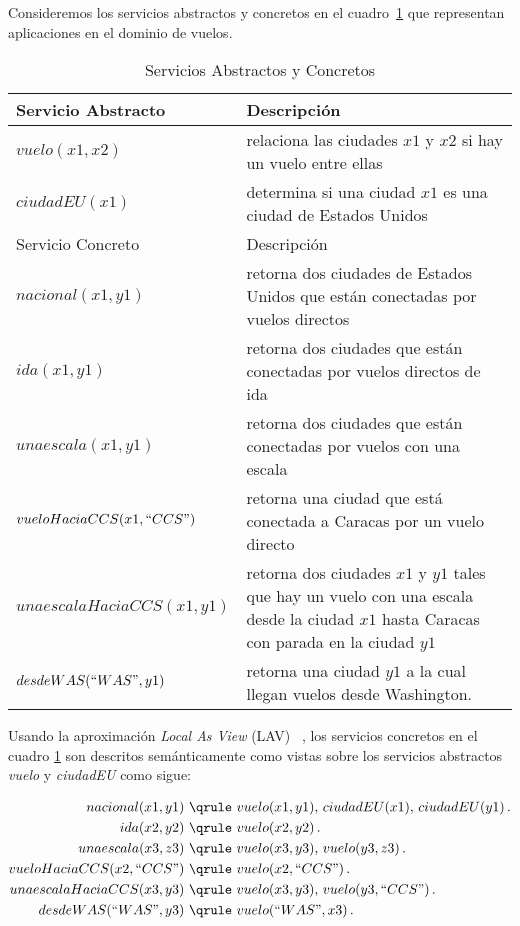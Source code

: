 Consideremos los servicios abstractos y concretos en el
cuadro~\ref{table:services} que representan aplicaciones en el dominio de
vuelos.

\begin{table}
\begin{tabular}{|l|p{8.00cm}|}
\hline
Servicio Abstracto & Descripción \\
\hline
$vuelo(x1,x2)$ & relaciona las ciudades $x1$ y $x2$ si hay un vuelo entre ellas\\
\hline
$ciudadEU(x1)$ &  determina si una ciudad $x1$ es una ciudad de Estados Unidos\\
\hline \hline
Servicio Concreto & Descripción \\
\hline
$nacional(x1,y1)$&  retorna dos ciudades de Estados Unidos que están conectadas
por vuelos directos \\
\hline
$ida(x1,y1)$ & retorna dos ciudades que están conectadas por vuelos directos
de ida\\
\hline
$unaescala(x1,y1)$ & retorna dos ciudades que están conectadas por vuelos con una
escala\\
\hline
$vueloHaciaCCS(x1, ``CCS")$ & retorna una ciudad que está conectada a Caracas por
un vuelo directo\\
 \hline
$unaescalaHaciaCCS(x1,y1)$ & retorna dos ciudades $x1$ y $y1$ tales que hay un vuelo con
una escala desde la ciudad $x1$ hasta Caracas con parada en la ciudad $y1$\\
\hline
$desdeWAS(``WAS",y1)$ &  retorna una ciudad $y1$ a la cual llegan vuelos desde
Washington.\\
 \hline
\end{tabular}
\label{table:services}
\caption{Servicios Abstractos y Concretos}
\end{table}

Usando la aproximación \emph{Local As View} (LAV) ~\cite{AmbiteISWC09}, los
servicios concretos en el cuadro \ref{table:services} son descritos
semánticamente como vistas sobre los servicios abstractos {\it vuelo} y
{\it ciudadEU} como sigue:   

\begin{alignat*}{1}
nacional(x1,y1)\ &\qrule\ vuelo(x1,y1),\,  ciudadEU(x1),\,  ciudadEU(y1)\,. \\
ida(x2,y2)\ &\qrule\ vuelo(x2,y2)\,. \\
unaescala(x3,z3)\ &\qrule\ vuelo(x3,y3),\, vuelo(y3,z3)\,. \\
vueloHaciaCCS(x2,``CCS")\ &\qrule\ vuelo(x2,``CCS")\,. \\
unaescalaHaciaCCS(x3,y3)\ &\qrule\ vuelo(x3,y3),\, vuelo(y3,``CCS")\,. \\
desdeWAS(``WAS",y3)\ &\qrule\ vuelo(``WAS",x3)\,. \\
\end{alignat*}

